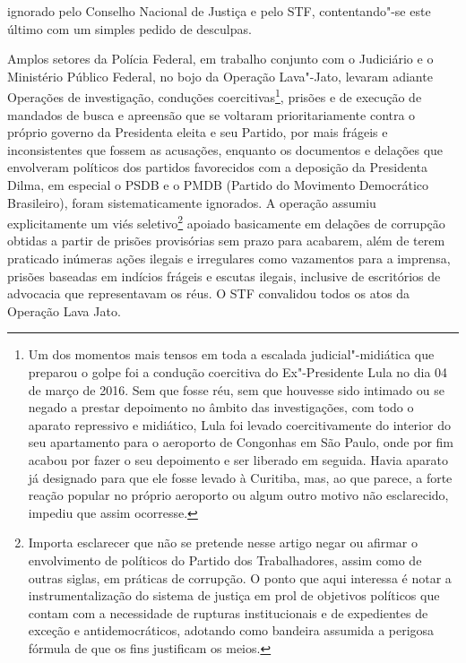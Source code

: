 ignorado pelo Conselho Nacional de Justiça e pelo STF, contentando"-se
este último com um simples pedido de desculpas.

Amplos setores da Polícia Federal, em trabalho conjunto com o Judiciário
e o Ministério Público Federal, no bojo da Operação Lava"-Jato, levaram
adiante Operações de investigação, conduções coercitivas\footnote{Um dos
  momentos mais tensos em toda a escalada judicial"-midiática que
  preparou o golpe foi a condução coercitiva do Ex"-Presidente Lula no
  dia 04 de março de 2016. Sem que fosse réu, sem que houvesse sido
  intimado ou se negado a prestar depoimento no âmbito das
  investigações, com todo o aparato repressivo e midiático, Lula foi
  levado coercitivamente do interior do seu apartamento para o aeroporto
  de Congonhas em São Paulo, onde por fim acabou por fazer o seu
  depoimento e ser liberado em seguida. Havia aparato já designado para
  que ele fosse levado à Curitiba, mas, ao que parece, a forte reação
  popular no próprio aeroporto ou algum outro motivo não esclarecido,
  impediu que assim ocorresse.}, prisões e de execução de mandados de
busca e apreensão que se voltaram prioritariamente contra o próprio
governo da Presidenta eleita e seu Partido, por mais frágeis e
inconsistentes que fossem as acusações, enquanto os documentos e
delações que envolveram políticos dos partidos favorecidos com a
deposição da Presidenta Dilma, em especial o PSDB e o PMDB (Partido do
Movimento Democrático Brasileiro), foram sistematicamente ignorados. A
operação assumiu explicitamente um viés seletivo\footnote{Importa
  esclarecer que não se pretende nesse artigo negar ou afirmar o
  envolvimento de políticos do Partido dos Trabalhadores, assim como de
  outras siglas, em práticas de corrupção. O ponto que aqui interessa é
  notar a instrumentalização do sistema de justiça em prol de objetivos
  políticos que contam com a necessidade de rupturas institucionais e de
  expedientes de exceção e antidemocráticos, adotando como bandeira
  assumida a perigosa fórmula de que os fins justificam os meios.}
apoiado basicamente em delações de corrupção obtidas a partir de prisões
provisórias sem prazo para acabarem, além de terem praticado inúmeras
ações ilegais e irregulares como vazamentos para a imprensa, prisões
baseadas em indícios frágeis e escutas ilegais, inclusive de escritórios
de advocacia que representavam os réus. O STF convalidou todos os atos
da Operação Lava Jato.

